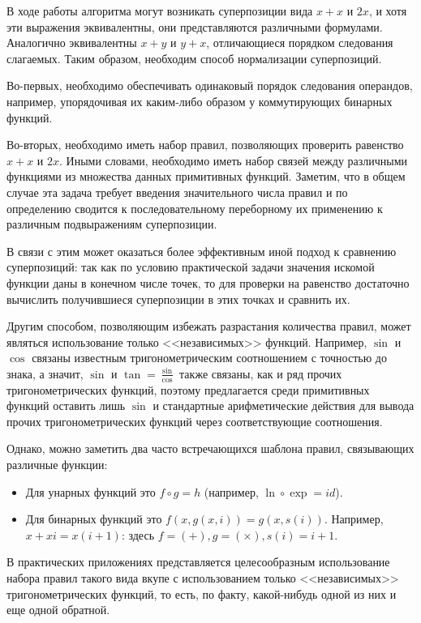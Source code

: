 \documentclass[12pt,a4paper]{amsart}
\begin{document}
В ходе работы алгоритма могут возникать суперпозиции вида $x + x$ и $2x$,
и хотя эти выражения эквивалентны, они представляются различными формулами.
Аналогично эквивалентны $x + y$ и $y + x$, отличающиеся порядком следования
слагаемых. Таким образом, необходим способ нормализации суперпозиций.

Во-первых, необходимо обеспечивать одинаковый порядок следования операндов,
например, упорядочивая их каким-либо образом у коммутирующих бинарных функций.

Во-вторых, необходимо иметь набор правил, позволяющих проверить равенство
$x + x$ и $2x$. Иными словами, необходимо иметь набор связей между различными
функциями из множества данных примитивных функций. Заметим, что в общем
случае эта задача требует введения значительного числа правил и по определению
сводится к последовательному переборному их применению к различным
подвыражениям суперпозиции.

В связи с этим может оказаться более эффективным иной подход к сравнению
суперпозиций: так как по условию практической задачи значения искомой функции
даны в конечном числе точек, то для проверки на равенство достаточно вычислить
получившиеся суперпозиции в этих точках и сравнить их.

Другим способом, позволяющим избежать разрастания количества правил, может
являться использование только <<независимых>> функций. Например, $\sin$ и
$\cos$ связаны известным тригонометрическим соотношением с точностью до знака,
а значит, $\sin$ и $\tan = \frac{\sin}{\cos}$ также связаны, как и ряд прочих
тригонометрических функций, поэтому предлагается среди примитивных функций
оставить лишь $\sin$ и стандартные арифметические действия для вывода прочих
тригонометрических функций через соответствующие соотношения.

Однако, можно заметить два часто встречающихся шаблона правил, связывающих
различные функции:
\begin{itemize}
  \item Для унарных функций это $f \circ g = h$ (например,
	$\ln \circ \exp = id$).
  \item Для бинарных функций это $ f (x, g (x, i)) = g (x, s (i)) $.
	Например, $x + xi = x(i+1)$: здесь $f = (+), g = (\times), s(i) = i + 1$.
\end{itemize}

В практических приложениях представляется целесообразным использование
набора правил такого вида вкупе с использованием только <<независимых>>
тригонометрических функций, то есть, по факту, какой-нибудь одной из них
и еще одной обратной.
\end{document}
